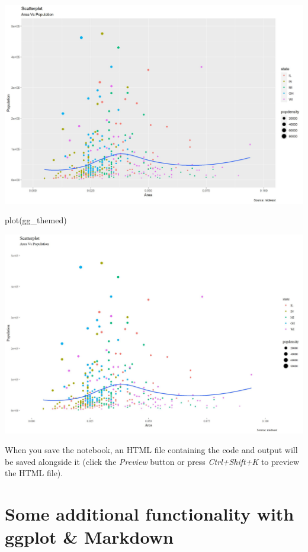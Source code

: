 \documentclass[
]{article}
\newenvironment{Shaded}{\begin{snugshade}}{\end{snugshade}}
\newcommand{\FunctionTok}[1]{\textcolor[rgb]{0.00,0.00,0.00}{#1}}
\newcommand{\NormalTok}[1]{#1}
\begin{document}
\includegraphics{figures/midwest-1.jpeg}

\begin{Shaded}
\begin{Highlighting}[]
\FunctionTok{plot}\NormalTok{(gg\_themed)}
\end{Highlighting}
\end{Shaded}

\includegraphics{figures/midwest-2.jpeg}

When you save the notebook, an HTML file containing the code and output
will be saved alongside it (click the \emph{Preview} button or press
\emph{Ctrl+Shift+K} to preview the HTML file).

\hypertarget{some-additional-functionality-with-ggplot-markdown}{%
\section{Some additional functionality with ggplot \&
Markdown}\label{some-additional-functionality-with-ggplot-markdown}}
\end{document}
